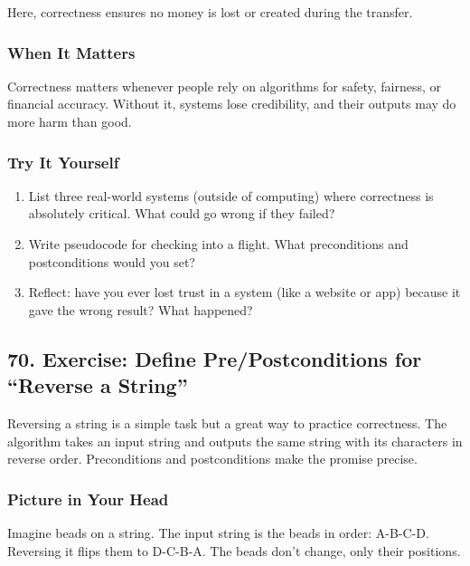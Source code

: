 \documentclass[
  letterpaper,
  DIV=11,
  numbers=noendperiod]{scrreprt}
\providecommand{\tightlist}{%
  \setlength{\itemsep}{0pt}\setlength{\parskip}{0pt}}
\begin{document}
Here, correctness ensures no money is lost or created during the
transfer.

\subsubsection{When It Matters}\label{when-it-matters-66}

Correctness matters whenever people rely on algorithms for safety,
fairness, or financial accuracy. Without it, systems lose credibility,
and their outputs may do more harm than good.

\subsubsection{Try It Yourself}\label{try-it-yourself-68}

\begin{enumerate}
\def\labelenumi{\arabic{enumi}.}
\tightlist
\item
  List three real-world systems (outside of computing) where correctness
  is absolutely critical. What could go wrong if they failed?
\item
  Write pseudocode for checking into a flight. What preconditions and
  postconditions would you set?
\item
  Reflect: have you ever lost trust in a system (like a website or app)
  because it gave the wrong result? What happened?
\end{enumerate}

\subsection{70. Exercise: Define Pre/Postconditions for ``Reverse a
String''}\label{exercise-define-prepostconditions-for-reverse-a-string}

Reversing a string is a simple task but a great way to practice
correctness. The algorithm takes an input string and outputs the same
string with its characters in reverse order. Preconditions and
postconditions make the promise precise.

\subsubsection{Picture in Your Head}\label{picture-in-your-head-69}

Imagine beads on a string. The input string is the beads in order:
A-B-C-D. Reversing it flips them to D-C-B-A. The beads don't change,
only their positions.
\end{document}
